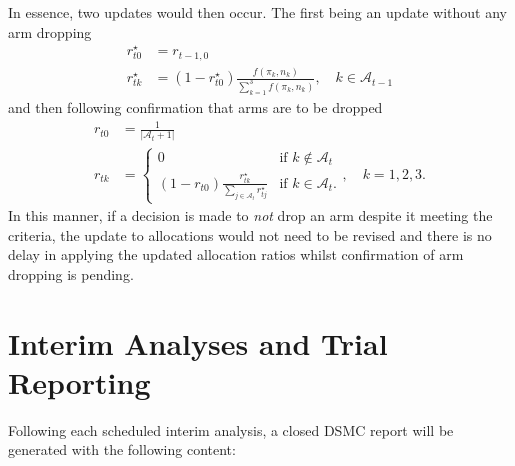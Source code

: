\documentclass[11pt,parskip=half-]{scrartcl}
\begin{document}
In essence, two updates would then occur. The first being an update without any arm dropping
$$
  \begin{aligned}
    r_{t0}^\star & = r_{t-1,0}                                                                                       \\
    r_{tk}^\star & = (1 - r_{t0}^\star)\frac{f(\pi_k, n_k)}{\sum_{k=1}^3 f(\pi_k, n_k)}, \quad k\in\mathcal{A}_{t-1}
  \end{aligned}
$$
and then following confirmation that arms are to be dropped
$$
  \begin{aligned}
    r_{t0} & = \frac{1}{|\mathcal{A}_t + 1|}              \\
    r_{tk} & = \begin{cases}
      0                                                                       & \text{if } k \notin \mathcal{A}_t \\
      (1 - r_{t0}) \frac{r_{tk}^\star}{\sum_{j\in\mathcal{A}_t} r_{tj}^\star} & \text{if } k \in \mathcal{A}_t.
    \end{cases}, \quad k=1,2,3.
  \end{aligned}
$$
In this manner, if a decision is made to \emph{not} drop an arm despite it meeting the criteria, the update to allocations would not need to be revised and there is no delay in applying the updated allocation ratios whilst confirmation of arm dropping is pending.

\clearpage

\section{Interim Analyses and Trial Reporting}\label{interim-analyses-and-trial-reporting}

Following each scheduled interim analysis, a closed DSMC report will be generated with the following content:
\end{document}
